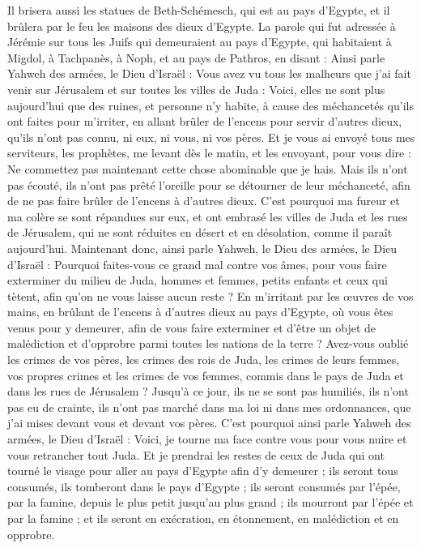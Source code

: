\begin{multicols}{2}
Il brisera aussi les statues de Beth-Schémesch, qui est au pays d'Egypte, et il brûlera par le feu les maisons des dieux d'Egypte.
\VerseOne{}La parole qui fut adressée à Jérémie sur tous les Juifs qui demeuraient au pays d'Egypte, qui habitaient à Migdol, à Tachpanès, à Noph, et au pays de Pathros, en disant :
Ainsi parle Yahweh des armées, le Dieu d'Israël : Vous avez vu tous les malheurs que j'ai fait venir sur Jérusalem et sur toutes les villes de Juda : Voici, elles ne sont plus aujourd'hui que des ruines, et personne n'y habite,
à cause des méchancetés qu'ils ont faites pour m'irriter, en allant brûler de l'encens pour servir d'autres dieux, qu'ils n'ont pas connu, ni eux, ni vous, ni vos pères.
Et je vous ai envoyé tous mes serviteurs, les prophètes, me levant dès le matin, et les envoyant, pour vous dire : Ne commettez pas maintenant cette chose abominable que je hais.
Mais ils n'ont pas écouté, ils n'ont pas prêté l'oreille pour se détourner de leur méchanceté, afin de ne pas faire brûler de l'encens à d'autres dieux.
C'est pourquoi ma fureur et ma colère se sont répandues sur eux, et ont embrasé les villes de Juda et les rues de Jérusalem, qui ne sont réduites en désert et en désolation, comme il paraît aujourd'hui.
Maintenant donc, ainsi parle Yahweh, le Dieu des armées, le Dieu d'Israël : Pourquoi faites-vous ce grand mal contre vos âmes, pour vous faire exterminer du milieu de Juda, hommes et femmes, petits enfants et ceux qui tètent, afin qu'on ne vous laisse aucun reste ?
En m'irritant par les œuvres de vos mains, en brûlant de l'encens à d'autres dieux au pays d'Egypte, où vous êtes venus pour y demeurer, afin de vous faire exterminer et d'être un objet de malédiction et d'opprobre parmi toutes les nations de la terre ?
Avez-vous oublié les crimes de vos pères, les crimes des rois de Juda, les crimes de leurs femmes, vos propres crimes et les crimes de vos femmes, commis dans le pays de Juda et dans les rues de Jérusalem ?
Jusqu'à ce jour, ils ne se sont pas humiliés, ils n'ont pas eu de crainte, ils n'ont pas marché dans ma loi ni dans mes ordonnances, que j'ai mises devant vous et devant vos pères.
C'est pourquoi ainsi parle Yahweh des armées, le Dieu d'Israël : Voici, je tourne ma face contre vous pour vous nuire et vous retrancher tout Juda.
Et je prendrai les restes de ceux de Juda qui ont tourné le visage pour aller au pays d'Egypte afin d'y demeurer ; ils seront tous consumés, ils tomberont dans le pays d'Egypte ; ils seront consumés par l'épée, par la famine, depuis le plus petit jusqu'au plus grand ; ils mourront par l'épée et par la famine ; et ils seront en exécration, en étonnement, en malédiction et en opprobre.

\end{multicols}
